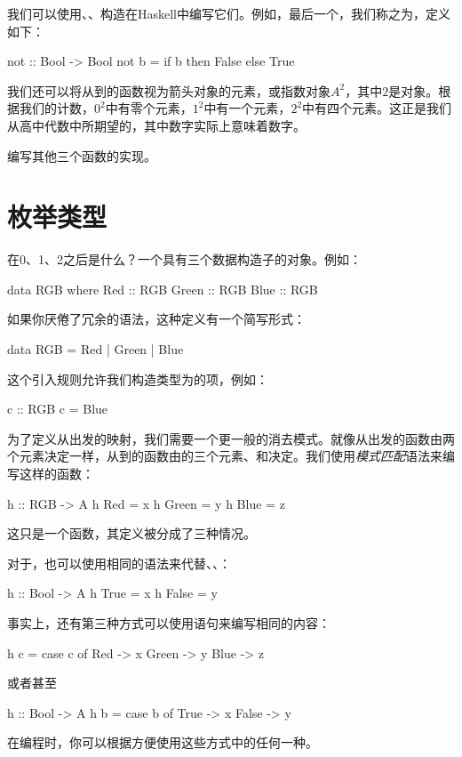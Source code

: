 \documentclass[DaoFP]{subfiles}
\begin{document}
我们可以使用、、构造在Haskell中编写它们。例如，最后一个，我们称之为，定义如下：
\begin{haskell}
not :: Bool -> Bool
not b = if b then False else True
\end{haskell}

我们还可以将从到的函数视为箭头对象的元素，或指数对象$A^2$，其中$2$是对象。根据我们的计数，$0^2$中有零个元素，$1^2$中有一个元素，$2^2$中有四个元素。这正是我们从高中代数中所期望的，其中数字实际上意味着数字。

\begin{exercise}
编写其他三个函数的实现。
\end{exercise}

\section{枚举类型}

在0、1、2之后是什么？一个具有三个数据构造子的对象。例如：
\begin{haskell}
data RGB where
  Red   :: RGB
  Green :: RGB
  Blue  :: RGB
\end{haskell}
如果你厌倦了冗余的语法，这种定义有一个简写形式：

\begin{haskell}
data RGB = Red | Green | Blue
\end{haskell}
这个引入规则允许我们构造类型为的项，例如：
\begin{haskell}
c :: RGB
c = Blue
\end{haskell}
为了定义从出发的映射，我们需要一个更一般的消去模式。就像从出发的函数由两个元素决定一样，从到的函数由的三个元素、和决定。我们使用\emph{模式匹配}语法来编写这样的函数：
\begin{haskell}
h :: RGB -> A
h Red   = x
h Green = y
h Blue  = z
\end{haskell}
这只是一个函数，其定义被分成了三种情况。

对于，也可以使用相同的语法来代替、、：
\begin{haskell}
h :: Bool -> A
h True  = x
h False = y
\end{haskell}
事实上，还有第三种方式可以使用语句来编写相同的内容：
\begin{haskell}
h c = case c of
  Red   -> x
  Green -> y
  Blue  -> z
\end{haskell}
或者甚至
\begin{haskell}
h :: Bool -> A
h b = case b of
  True  -> x
  False -> y
\end{haskell}
在编程时，你可以根据方便使用这些方式中的任何一种。
\end{document}
